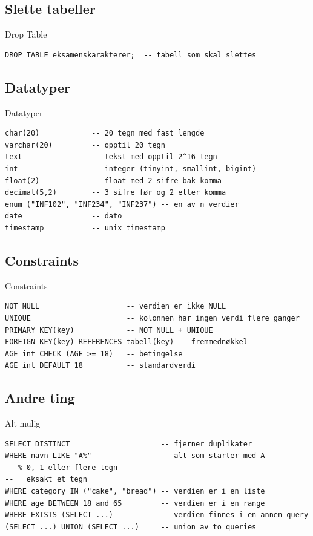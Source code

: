 \subsection*{Slette tabeller}
\begin{frame}[fragile]{Drop Table}
\begin{verbatim}
DROP TABLE eksamenskarakterer;  -- tabell som skal slettes 
\end{verbatim}
\end{frame}

\subsection*{Datatyper}
\begin{frame}[fragile]{Datatyper}
\begin{verbatim}
char(20)            -- 20 tegn med fast lengde
varchar(20)         -- opptil 20 tegn
text                -- tekst med opptil 2^16 tegn
int                 -- integer (tinyint, smallint, bigint)
float(2)            -- float med 2 sifre bak komma
decimal(5,2)        -- 3 sifre før og 2 etter komma
enum ("INF102", "INF234", "INF237") -- en av n verdier
date                -- dato
timestamp           -- unix timestamp
\end{verbatim}
\end{frame}

\subsection*{Constraints}
\begin{frame}[fragile]{Constraints}
\begin{verbatim}
NOT NULL                    -- verdien er ikke NULL
UNIQUE                      -- kolonnen har ingen verdi flere ganger
PRIMARY KEY(key)            -- NOT NULL + UNIQUE
FOREIGN KEY(key) REFERENCES tabell(key) -- fremmednøkkel
AGE int CHECK (AGE >= 18)   -- betingelse
AGE int DEFAULT 18          -- standardverdi
\end{verbatim}
\end{frame}

\subsection*{Andre ting}
\begin{frame}[fragile]{Alt mulig}
\begin{verbatim}
SELECT DISTINCT                     -- fjerner duplikater
WHERE navn LIKE "A%"                -- alt som starter med A
-- % 0, 1 eller flere tegn
-- _ eksakt et tegn
WHERE category IN ("cake", "bread") -- verdien er i en liste
WHERE age BETWEEN 18 and 65         -- verdien er i en range
WHERE EXISTS (SELECT ...)           -- verdien finnes i en annen query
(SELECT ...) UNION (SELECT ...)     -- union av to queries
\end{verbatim}
\end{frame}

